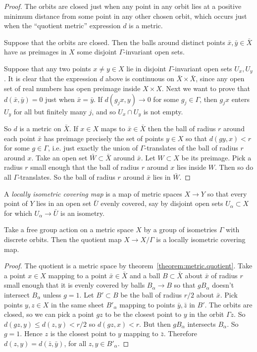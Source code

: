 \begin{proof}
The orbits are closed just when any point in any orbit lies at a positive minimum distance from some point in any other chosen orbit, which occurs just when the ``quotient metric'' expression \(d\) is a metric.

Suppose that the orbits are closed.
Then the balls around distinct points \(\bar{x},\bar{y} \in \bar{X}\) have as preimages in \(X\) some disjoint \(\Gamma\)-invariant open sets.

Suppose that any two points \(x \ne y \in X\) lie in disjoint \(\Gamma\)-invariant open sets \(U_x, U_y\).
It is clear that the expression \(d\) above is continuous on \(\bar{X} \times \bar{X}\), since any open set of real numbers has open preimage inside \(X \times X\).
Next we want to prove that \(d(\bar{x},\bar{y})=0\) just when \(\bar{x}=\bar{y}\).
If \(d(g_j x, y) \to 0\) for some \(g_j \in \Gamma\), then \(g_j x\) enters \(U_y\) for all but finitely many \(j\), and so \(U_x \cap U_y\) is not empty.

So \(d\) is a metric on \(\bar{X}\).
If \(x \in X\) maps to \(\bar{x} \in \bar{X}\) then the ball of radius \(r\) around each point \(\bar{x}\) has preimage precisely the set of points \(y \in X\) so that \(d(gy,x)<r\) for some \(g \in \Gamma\), i.e. just exactly the union of \(\Gamma\)-translates of the ball of radius \(r\) around \(x\).
Take an open set \(\bar{W} \subset \bar{X}\) around \(\bar{x}\).
Let \(W \subset X\) be its preimage.
Pick a radius \(r\) small enough that the ball of radius \(r\) around \(x\) lies inside \(W\).
Then so do all \(\Gamma\)-translates.
So the ball of radius \(r\) around \(\bar{x}\) lies in \(\bar{W}\).
\end{proof}
A \emph{locally isometric covering map} is a map of metric spaces \(X \to Y\) so that every point of \(Y\) lies in an open set \(\bar{U}\) evenly covered, say by disjoint open sets \(U_{\alpha} \subset X\) for which \(U_{\alpha} \to \bar{U}\) is an isometry.
\begin{theorem}
Take a free group action on a metric space \(X\) by a group of isometries \(\Gamma\) with discrete orbits.
Then the quotient map \(X \to X/\Gamma\) is a locally isometric covering map.
\end{theorem}
\begin{proof}
The quotient is a metric space by theorem~\vref{theorem:metric.quotient}.
Take a point \(x \in X\) mapping to a point \(\bar{x} \in \bar{X}\) and a ball \(B \subset \bar{X}\) about \(\bar{x}\) of radius \(r\) small enough that it is evenly covered by balls \(B_{\alpha} \to B\) so that \(gB_{\alpha}\) doesn't intersect \(B_{\alpha}\) unless \(g=1\).
Let \(B' \subset B\) be the ball of radius \(r/2\) about \(\bar{x}\).
Pick points \(y,z \in X\) in the same sheet \(B'_{\alpha}\) mapping to points \(\bar{y}, \bar{z}\) in \(B'\).
The orbits are closed, so we can pick a point \(gz\) to be the closest point to \(y\) in the orbit \(\Gamma z\).
So \(d(gz,y)\le d(z,y)<r/2\) so \(d(gz,x) < r\).
But then \(gB_{\alpha}\) intersects \(B_{\alpha}\).
So \(g=1\).
Hence \(z\) is the closest point to \(y\) mapping to \(\bar{z}\).
Therefore \(d(z,y)=d(\bar{z},\bar{y})\), for all \(z,y \in B'_{\alpha}\).
\end{proof}
